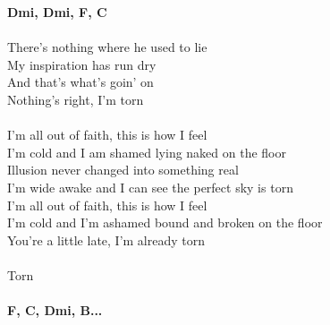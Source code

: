 \footnotesize\textbf{Dmi, Dmi, F, C}\\
\normalsize
\\
There's nothing where he used to lie\\
My inspiration has run dry\\
And that's what's goin' on\\
Nothing's right, I'm torn\\
\\
I'm all out of faith, this is how I feel\\
I'm cold and I am shamed lying naked on the floor\\
Illusion never changed into something real\\
I'm wide awake and I can see the perfect sky is torn\\
I'm all out of faith, this is how I feel\\
I'm cold and I'm ashamed bound and broken on the floor\\
You're a little late, I'm already torn\\
\\
Torn\\
\\
\footnotesize\textbf{F, C, Dmi, B\be ...}\normalsize
